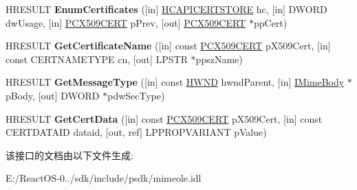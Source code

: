 \begin{DoxyCompactItemize}
\item 
\mbox{\label{interface_m_i_m_e_o_l_e_1_1_i_mime_security_ae11fa19f3d23e5130d9264e8a12da40f}} 
H\+R\+E\+S\+U\+LT {\bfseries Enum\+Certificates} (\mbox{[}in\mbox{]} \hyperlink{interfacevoid}{H\+C\+A\+P\+I\+C\+E\+R\+T\+S\+T\+O\+RE} hc, \mbox{[}in\mbox{]} D\+W\+O\+RD dw\+Usage, \mbox{[}in\mbox{]} \hyperlink{struct___c_e_r_t___c_o_n_t_e_x_t}{P\+C\+X509\+C\+E\+RT} p\+Prev, \mbox{[}out\mbox{]} \hyperlink{struct___c_e_r_t___c_o_n_t_e_x_t}{P\+C\+X509\+C\+E\+RT} $\ast$pp\+Cert)
\item 
\mbox{\label{interface_m_i_m_e_o_l_e_1_1_i_mime_security_ad70214a28a1dba7255406770a4f29965}} 
H\+R\+E\+S\+U\+LT {\bfseries Get\+Certificate\+Name} (\mbox{[}in\mbox{]} const \hyperlink{struct___c_e_r_t___c_o_n_t_e_x_t}{P\+C\+X509\+C\+E\+RT} p\+X509\+Cert, \mbox{[}in\mbox{]} const C\+E\+R\+T\+N\+A\+M\+E\+T\+Y\+PE cn, \mbox{[}out\mbox{]} L\+P\+S\+TR $\ast$ppsz\+Name)
\item 
\mbox{\label{interface_m_i_m_e_o_l_e_1_1_i_mime_security_a56840eb8c95ae9f089de2477c838df42}} 
H\+R\+E\+S\+U\+LT {\bfseries Get\+Message\+Type} (\mbox{[}in\mbox{]} const \hyperlink{interfacevoid}{H\+W\+ND} hwnd\+Parent, \mbox{[}in\mbox{]} \hyperlink{interface_m_i_m_e_o_l_e_1_1_i_mime_body}{I\+Mime\+Body} $\ast$p\+Body, \mbox{[}out\mbox{]} D\+W\+O\+RD $\ast$pdw\+Sec\+Type)
\item 
\mbox{\label{interface_m_i_m_e_o_l_e_1_1_i_mime_security_a2130516c46ff7f36cbe249f20e457644}} 
H\+R\+E\+S\+U\+LT {\bfseries Get\+Cert\+Data} (\mbox{[}in\mbox{]} const \hyperlink{struct___c_e_r_t___c_o_n_t_e_x_t}{P\+C\+X509\+C\+E\+RT} p\+X509\+Cert, \mbox{[}in\mbox{]} const C\+E\+R\+T\+D\+A\+T\+A\+ID dataid, \mbox{[}out, ref\mbox{]} L\+P\+P\+R\+O\+P\+V\+A\+R\+I\+A\+NT p\+Value)
\end{DoxyCompactItemize}


该接口的文档由以下文件生成\+:\begin{DoxyCompactItemize}
\item 
E\+:/\+React\+O\+S-\/0../sdk/include/psdk/mimeole.\+idl\end{DoxyCompactItemize}
